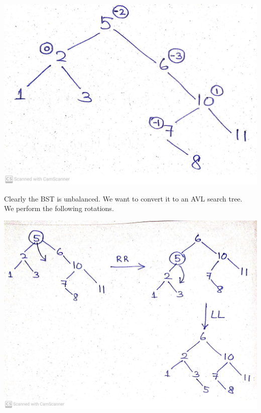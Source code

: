 \documentclass[10pt, a4paper]{extarticle}
\theoremstyle{definition}
\begin{document}
		\begin{center}
			\includegraphics[scale=0.1]{balance1.jpg}\\
		\end{center}
		Clearly the BST is unbalanced. We want to convert it to an AVL search tree.\\
		We perform the following rotations.
		\begin{center}
			\includegraphics[scale=0.14]{balance2.jpg}\\
		\end{center}
\end{document}
